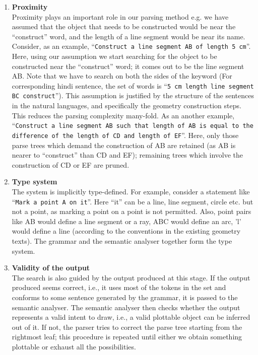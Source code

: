 \def\DevnagVersion{2.15}\documentclass[12pt]{article}
\begin{document}
\begin{enumerate}
\item \textbf{Proximity}\label{sec:proximity}\\
Proximity plays an important role in our parsing method e.g. we have assumed that the object that needs to be constructed would be near the ``construct'' word, and the length of a line segment would be near its name. Consider, as an example, ``\texttt{Construct a line segment AB of length 5 cm}''. Here, using our assumption we start searching for the object to be constructed near the ``construct'' word; it comes out to be the line segment AB. Note that we have to search on both the sides of the keyword (For corresponding hindi sentence, the set of words is ``\texttt{5 cm length line segment BC construct}''). This assumption is justified by the structure of the sentences in the natural languages, and specifically the geometry construction steps. This reduces the parsing complexity many-fold. As an another example, ``\texttt{Construct a line segment AB such that length of AB is equal to the difference of the length of CD and length of EF}''. Here, only those parse trees which demand the construction of AB are retained (as AB is nearer to ``construct'' than CD and EF); remaining trees which involve the construction of CD or EF are pruned.

\item \textbf{Type system}\\
The system is implicitly type-defined. For example, consider a statement like  ``\texttt{Mark a point A on it}''. Here ``it'' can be a line, line segment, circle etc. but not a point, as marking a point on a point is not permitted. Also, point pairs like AB would define a line segment or a ray, ABC would define an arc, 'l' would define a line (according to the conventions in the existing geometry texts). The grammar and the semantic analyser together form the type system.

\item \textbf{Validity of the output}\\
The search is also guided by the output produced at this stage. If the output produced seems correct, i.e., it uses most of the tokens in the set and conforms to some sentence generated by the grammar, it is passed to the semantic analyser. The semantic analyser then checks whether the output represents a valid intent to draw, i.e., a valid plottable object can be inferred out of it. If not, the parser tries to correct the parse tree starting from the rightmost leaf; this procedure is repeated until either we obtain something plottable or exhaust all the possibilities.

\end{enumerate}
\end{document}
